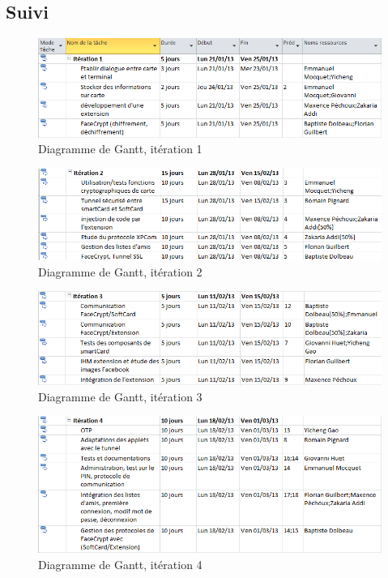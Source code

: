 \documentclass[a4paper,11pt,french]{article}
\begin{document}
\clearpage

\subsection{Suivi}

\begin{center}
\begin{figure}[!h]
\includegraphics[scale=0.70]{iteration1.png}
\caption{Diagramme de Gantt, itération 1}
\end{figure}
\end{center}

\begin{center}
\begin{figure}[!h]
\includegraphics[scale=0.70]{iteration2.png}
\caption{Diagramme de Gantt, itération 2}
\end{figure}
\end{center}

\begin{center}
\begin{figure}[!h]
\includegraphics[scale=0.70]{iteration3.png}
\caption{Diagramme de Gantt, itération 3}
\end{figure}
\end{center}

\begin{center}
\begin{figure}[!h]
\includegraphics[scale=0.70]{iteration4.png}
\caption{Diagramme de Gantt, itération 4}
\end{figure}
\end{center}
\end{document}
